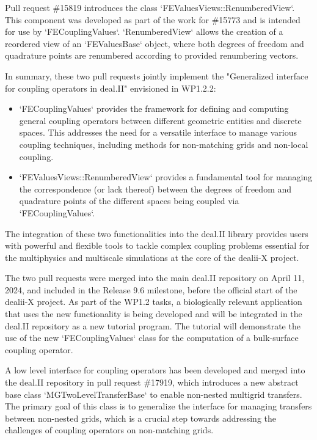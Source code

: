 \documentclass[a4paper,12pt]{article}
\begin{document}
    Pull request \#15819 introduces the class `FEValuesViews::RenumberedView`.
    This component was developed as part of the work for \#15773 and is intended
    for use by `FECouplingValues`. `RenumberedView` allows the creation of a
    reordered view of an `FEValuesBase` object, where both degrees of freedom
    and quadrature points are renumbered according to provided renumbering
    vectors.

    In summary, these two pull requests jointly implement the "Generalized interface for coupling operators in deal.II" envisioned in WP1.2.2:
    \begin{itemize}
        \item `FECouplingValues` provides the framework for defining and
        computing general coupling operators between different geometric
        entities and discrete spaces. This addresses the need for a versatile
        interface to manage various coupling techniques, including methods for
        non-matching grids and non-local coupling.
        \item `FEValuesViews::RenumberedView` provides a fundamental tool for managing the correspondence (or lack thereof) between the degrees of freedom and quadrature points of the different spaces being coupled via `FECouplingValues`.
    \end{itemize}

    The integration of these two functionalities into the deal.II library
    provides users with powerful and flexible tools to tackle complex coupling
    problems essential for the multiphysics and multiscale simulations at the
    core of the dealii-X project.

    The two pull requests were merged into the main deal.II repository on April
    11, 2024, and included in the Release 9.6 milestone, before the official
    start of the dealii-X project. As part of the WP1.2 tasks, a biologically
    relevant application that uses the new functionality is being developed and
    will be integrated in the deal.II repository as a new tutorial program. The
    tutorial will demonstrate the use of the new `FECouplingValues` class for
    the computation of a bulk-surface coupling operator.

    A low level interface for coupling operators has been developed and merged
    into the deal.II repository in pull request \#17919, which introduces a new
    abstract base class `MGTwoLevelTransferBase` to enable non-nested multigrid
    transfers. The primary goal of this class is to generalize the interface for
    managing transfers between non-nested grids, which is a crucial step towards
    addressing the challenges of coupling operators on non-matching grids. 
\end{document}
